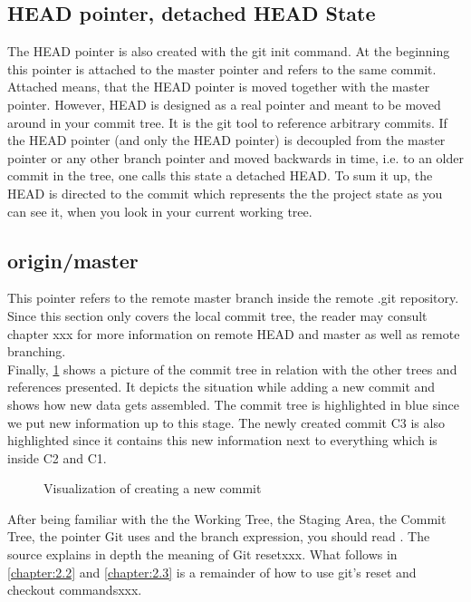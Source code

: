 \subsection*{HEAD pointer, detached HEAD State}
The HEAD pointer is also created with the git init command. At the beginning this pointer is attached to 
the master pointer and refers to the same commit. Attached means, that the HEAD pointer is moved together 
with the master pointer. However, HEAD is designed as a real pointer and meant to be moved around in 
your commit tree. It is the git tool to reference arbitrary commits.
If the HEAD pointer (and only the HEAD pointer) is decoupled from the master pointer or any other branch pointer and moved backwards in time, i.e. to an older 
commit in the tree, one calls this state a detached HEAD.
To sum it up, the HEAD is directed to the commit which represents the the project state as you can see it, when you 
look in your current working tree.

\subsection*{origin/master} 
This pointer refers to the remote master branch inside the remote .git repository. Since this section only 
covers the local commit tree, the reader may consult chapter xxx for more information on remote HEAD and master
as well as remote branching. 
\\
Finally, \cref{fig:GitAddCommit} shows a picture of the commit tree in relation with the other trees and references
presented. It depicts the situation while adding a new commit and shows how new data gets assembled.
The commit tree is highlighted in blue since we put new information up to this stage. The newly created commit C3 
is also highlighted since it contains this new information next to everything which is inside C2 and C1.
\begin{figure}[H]
	\centering
	
	\caption{Visualization of creating a new commit}
	\label{fig:GitAddCommit}
\end{figure}


After being familiar with the the Working Tree, the Staging Area, the Commit Tree, the pointer Git uses and 
the branch expression, you should read \cite{Unknown2021GitTools-Reset}. The source explains in depth the meaning 
of Git resetxxx.
What follows in \cref{chapter:2.2} and \cref{chapter:2.3} is a remainder of how to use git's reset and checkout commandsxxx.
 


